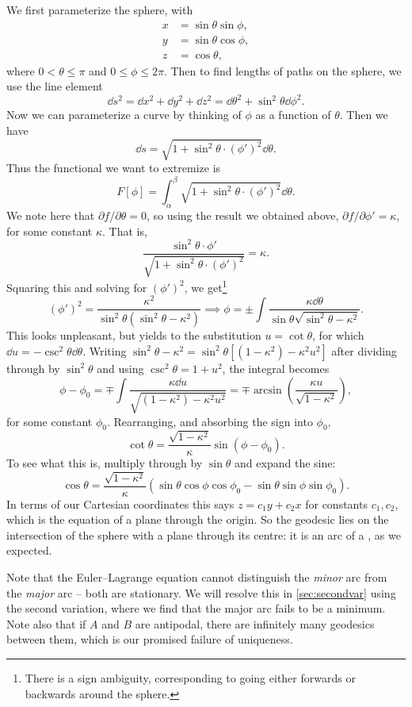 \documentclass[a4paper]{scrartcl}
\begin{document}
\begin{example}
	We first parameterize the sphere, with
	\begin{align*}
		x &= \sin \theta \sin \phi, \\
		y &= \sin \theta \cos \phi, \\
		z &= \cos \theta,
	\end{align*}
	where $0 < \theta \leq \pi$ and $0 \leq \phi \leq 2 \pi$. Then to find lengths of paths on the sphere, we use the line element
	$$
	\dd s^2 = \dd x^2 + \dd y^2 + \dd z^2 = \dd \theta^2 + \sin^2 \theta \dd \phi^2.
	$$
	Now we can parameterize a curve by thinking of $\phi$ as a function of $\theta$. Then we have
	$$
	\dd s = \sqrt{1 + \sin^2 \theta \cdot (\phi')^2} \dd \theta.
	$$
	Thus the functional we want to extremize is
	$$
	F[\phi] = \int_{\alpha}^{\beta} \sqrt{1 + \sin^2 \theta \cdot (\phi')^2} \dd \theta.
	$$
	We note here that $\partial f/ \partial \theta = 0$, so using the result we obtained above, $\partial f/\partial \phi' = \kappa$, for some constant $\kappa$. That is,
	$$
\frac{\sin^2 \theta \cdot \phi'}{\sqrt{1 + \sin^2 \theta \cdot (\phi')^2}} = \kappa.
	$$
	Squaring this and solving for $(\phi')^2$, we get\footnote{There is a sign ambiguity, corresponding to going either forwards or backwards around the sphere.}
	$$
	(\phi')^2 = \frac{\kappa^2}{\sin^2 \theta \left(\sin^2 \theta - \kappa^2\right)} \implies \phi = \pm \int \frac{\kappa \dd \theta}{\sin \theta \sqrt{\sin^2 \theta - \kappa^2}}.
	$$
	This looks unpleasant, but yields to the substitution $u = \cot\theta$, for which $\dd u = -\csc^2\theta \dd\theta$. Writing $\sin^2\theta - \kappa^2 = \sin^2\theta\left[(1 - \kappa^2) - \kappa^2 u^2\right]$ after dividing through by $\sin^2\theta$ and using $\csc^2\theta = 1 + u^2$, the integral becomes
	$$
	\phi - \phi_0 = \mp\int \frac{\kappa \dd u}{\sqrt{(1 - \kappa^2) - \kappa^2 u^2}} = \mp \arcsin\left(\frac{\kappa u}{\sqrt{1 - \kappa^2}}\right),
	$$
	for some constant $\phi_0$. Rearranging, and absorbing the sign into $\phi_0$,
	$$
	\cot\theta = \frac{\sqrt{1 - \kappa^2}}{\kappa}\sin(\phi - \phi_0).
	$$
	To see what this is, multiply through by $\sin\theta$ and expand the sine:
	$$
	\cos\theta = \frac{\sqrt{1 - \kappa^2}}{\kappa}\left(\sin\theta\cos\phi\cos\phi_0 - \sin\theta\sin\phi \sin\phi_0\right).
	$$
	In terms of our Cartesian coordinates this says $z = c_1 y + c_2 x$ for constants $c_1, c_2$, which is the equation of a plane through the origin. So the geodesic lies on the intersection of the sphere with a plane through its centre: it is an arc of a , as we expected.

	Note that the Euler--Lagrange equation cannot distinguish the \emph{minor} arc from the \emph{major} arc -- both are stationary. We will resolve this in \autoref{sec:secondvar} using the second variation, where we find that the major arc fails to be a minimum. Note also that if $A$ and $B$ are antipodal, there are infinitely many geodesics between them, which is our promised failure of uniqueness.
\end{example}
\end{document}
